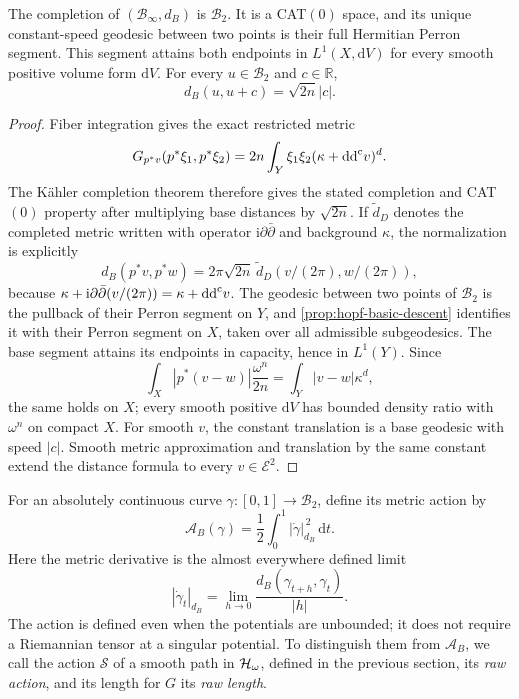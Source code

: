 \begin{theorem}\label{thm:hopf-basic-completion}
The completion of $(\mathcal B_\infty,d_B)$ is $\mathcal B_2$. It is a CAT$(0)$ space, and its unique constant-speed geodesic between two points is their full Hermitian Perron segment. This segment attains both endpoints in $L^1(X,\mathrm dV)$ for every smooth positive volume form $\mathrm dV$. For every $u\in\mathcal B_2$ and $c\in\mathbb R$,
\[
 d_B(u,u+c)=\sqrt{2n}|c|.
\]
\end{theorem}
\begin{proof}
Fiber integration gives the exact restricted metric
\begin{equation}\label{eq:hopf-basic-metric}
 G_{p^*v}(p^*\xi_1,p^*\xi_2)
 =2n\int_Y\xi_1\xi_2(\kappa+\mathrm{dd}^{\mathrm{c}} v)^d.
\end{equation}
The K\"ahler completion theorem therefore gives the stated completion and CAT$(0)$ property after multiplying base distances by $\sqrt{2n}$. If $\widetilde d_D$ denotes the completed metric written with operator $\mathrm i\partial\bar\partial$ and background $\kappa$, the normalization is explicitly
\begin{equation}\label{eq:hopf-basic-distance}
 d_B(p^*v,p^*w)
 =2\pi\sqrt{2n}\,\widetilde d_D(v/(2\pi),w/(2\pi)),
\end{equation}
because $\kappa+\mathrm i\partial\bar\partial(v/(2\pi))=\kappa+\mathrm{dd}^{\mathrm{c}} v$.
The geodesic between two points of $\mathcal B_2$ is the pullback of their Perron segment on $Y$, and \cref{prop:hopf-basic-descent} identifies it with their Perron segment on $X$, taken over all admissible subgeodesics. The base segment attains its endpoints in capacity, hence in $L^1(Y)$. Since
\[
 \int_X|p^*(v-w)|\frac{\omega^n}{2n}
 =\int_Y|v-w|\kappa^d,
\]
the same holds on $X$; every smooth positive $\mathrm dV$ has bounded density ratio with $\omega^n$ on compact $X$. For smooth $v$, the constant translation is a base geodesic with speed $|c|$. Smooth metric approximation and translation by the same constant extend the distance formula to every $v\in\mathcal E^2$.
\end{proof}

For an absolutely continuous curve $\gamma\colon[0,1]\to\mathcal B_2$, define its metric action by
\[
 \mathcal A_B(\gamma)=\frac12\int_0^1|\dot\gamma|_{d_B}^{\,2}\,\mathrm dt.
\]
Here the metric derivative is the almost everywhere defined limit
\[
 |\dot\gamma_t|_{d_B}
 =\lim_{h\to0}\frac{d_B(\gamma_{t+h},\gamma_t)}{|h|}.
\]
The action is defined even when the potentials are unbounded; it does not require a Riemannian tensor at a singular potential. To distinguish them from $\mathcal A_B$, we call the action $\mathscr S$ of a smooth path in $\mathcal H_\omega$, defined in the previous section, its \emph{raw action}, and its length for $G$ its \emph{raw length}.

